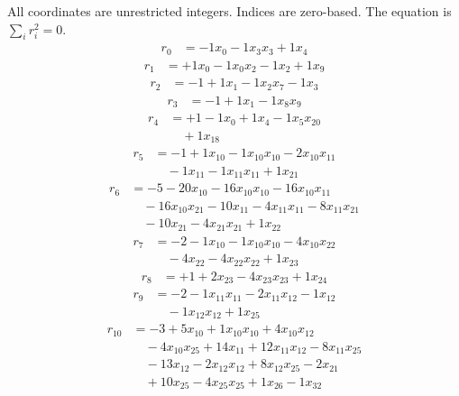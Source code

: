 \begingroup\small
All coordinates are unrestricted integers. Indices are zero-based. The equation is $\sum_i r_i^2=0$.
\[\begin{aligned}
r_{0} &= - 1 x_{0} - 1 x_{3} x_{3} + 1 x_{4}
\end{aligned}\]
\[\begin{aligned}
r_{1} &= + 1 x_{0} - 1 x_{0} x_{2} - 1 x_{2} + 1 x_{9}
\end{aligned}\]
\[\begin{aligned}
r_{2} &= - 1 + 1 x_{1} - 1 x_{2} x_{7} - 1 x_{3}
\end{aligned}\]
\[\begin{aligned}
r_{3} &= - 1 + 1 x_{1} - 1 x_{8} x_{9}
\end{aligned}\]
\[\begin{aligned}
r_{4} &= + 1 - 1 x_{0} + 1 x_{4} - 1 x_{5} x_{20} \\
 &\quad + 1 x_{18}
\end{aligned}\]
\[\begin{aligned}
r_{5} &= - 1 + 1 x_{10} - 1 x_{10} x_{10} - 2 x_{10} x_{11} \\
 &\quad - 1 x_{11} - 1 x_{11} x_{11} + 1 x_{21}
\end{aligned}\]
\[\begin{aligned}
r_{6} &= - 5 - 20 x_{10} - 16 x_{10} x_{10} - 16 x_{10} x_{11} \\
 &\quad - 16 x_{10} x_{21} - 10 x_{11} - 4 x_{11} x_{11} - 8 x_{11} x_{21} \\
 &\quad - 10 x_{21} - 4 x_{21} x_{21} + 1 x_{22}
\end{aligned}\]
\[\begin{aligned}
r_{7} &= - 2 - 1 x_{10} - 1 x_{10} x_{10} - 4 x_{10} x_{22} \\
 &\quad - 4 x_{22} - 4 x_{22} x_{22} + 1 x_{23}
\end{aligned}\]
\[\begin{aligned}
r_{8} &= + 1 + 2 x_{23} - 4 x_{23} x_{23} + 1 x_{24}
\end{aligned}\]
\[\begin{aligned}
r_{9} &= - 2 - 1 x_{11} x_{11} - 2 x_{11} x_{12} - 1 x_{12} \\
 &\quad - 1 x_{12} x_{12} + 1 x_{25}
\end{aligned}\]
\[\begin{aligned}
r_{10} &= - 3 + 5 x_{10} + 1 x_{10} x_{10} + 4 x_{10} x_{12} \\
 &\quad - 4 x_{10} x_{25} + 14 x_{11} + 12 x_{11} x_{12} - 8 x_{11} x_{25} \\
 &\quad - 13 x_{12} - 2 x_{12} x_{12} + 8 x_{12} x_{25} - 2 x_{21} \\
 &\quad + 10 x_{25} - 4 x_{25} x_{25} + 1 x_{26} - 1 x_{32}
\end{aligned}\]
